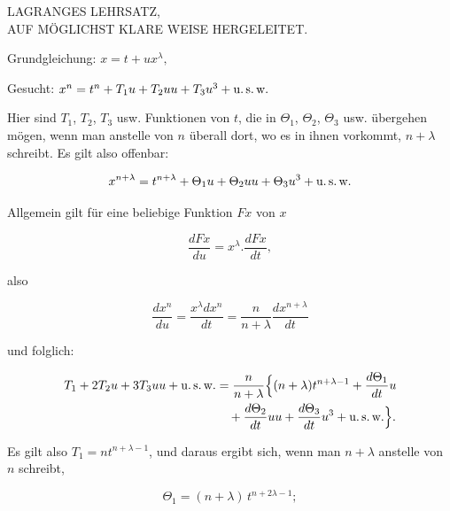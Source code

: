 \clearpage
{}%

\begin{center}
\large LAGRANGES LEHRSATZ,\\ AUF MÖGLICHST KLARE WEISE HERGELEITET.
\end{center}

\begin{center}\end{center}

\noindent Grundgleichung: \quad $x = t + u x^{\lambda},$

\noindent Gesucht: \quad $x^n = t^n + T_1 u + T_2 uu + T_3 u^3 + \text{u.\,s.\,w.}$

\noindent Hier sind $T_1$, $T_2$, $T_3$ usw. Funktionen von $t$, die in $\Theta_1$, $\Theta_2$, $\Theta_3$ usw. übergehen mögen, wenn man anstelle von $n$ überall dort, wo es in ihnen vorkommt, $n+\lambda$ schreibt. Es gilt also offenbar:

\[ x^{n+\lambda} = t^{n+\lambda} + \Theta_1 u + \Theta_2 uu + \Theta_3 u^3 + \text{u.\,s.\,w.} \]

Allgemein gilt für eine beliebige Funktion $Fx$ von $x$

\[ \frac{dFx}{du} = x^{\lambda} \mathord{.} \frac{dFx}{dt}, \]

\noindent also

\[ \frac{dx^n}{du} = \frac{x^{\lambda} dx^n}{dt} = \frac{n}{n+\lambda} \frac{dx^{n+\lambda}}{dt} \]

\noindent und folglich:

\[\begin{aligned}
T_1 + 2 T_2 u + 3 T_3 uu + \text{u.\,s.\,w.}
&= \frac{n}{n+\lambda}\Bigl\{(n+\lambda)t^{n+\lambda-1}+\frac{d\Theta_1}{dt}u\\
&\quad+\frac{d\Theta_2}{dt}uu+\frac{d\Theta_3}{dt}u^3+\text{u.\,s.\,w.}\Bigr\}.
\end{aligned}\]

\noindent Es gilt also $T_1 = n t^{n+\lambda-1}$, und daraus ergibt sich, wenn man $n+\lambda$ anstelle von $n$ schreibt,

\[ \Theta_1 = (n+\lambda)\, t^{n+2\lambda-1}; \]
